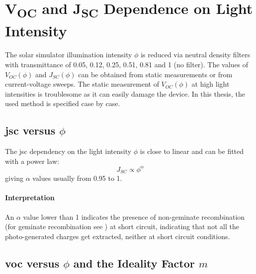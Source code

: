 \section{V\textsubscript{OC} and J\textsubscript{SC} Dependence on Light Intensity}
	The solar simulator illumination intensity $\phi$ is reduced via neutral density filters with transmittance of 0.05, 0.12, 0.25, 0.51, 0.81 and 1 (no filter). The values of $V_{OC}(\phi)$ and $J_{SC}(\phi)$ can be obtained from static measurements or from current-voltage sweeps. The static measurement of $V_{OC}(\phi)$ at high light intensities is troublesome as it can easily damage the device. In this thesis, the used method is specified case by case. %

	\subsection{\Gls{jsc} versus $\phi$}
		The \gls{jsc} dependency on the light intensity $\phi$ is close to linear and can be fitted with a power law:
		\begin{equation} \label{eq:jsc-phi}
			J_{SC} \propto \phi^\alpha
		\end{equation}
		giving $\alpha$ values usually from 0.95 to 1.

		\paragraph{Interpretation} %
		An $\alpha$ value lower than 1 indicates the presence of non-geminate recombination (for geminate recombination see ) at short circuit\cite{Credgington2011}, indicating that not all the photo-generated charges get extracted, neither at short circuit conditions.

	\subsection{\Gls{voc} versus $\phi$ and the Ideality Factor $m$}

